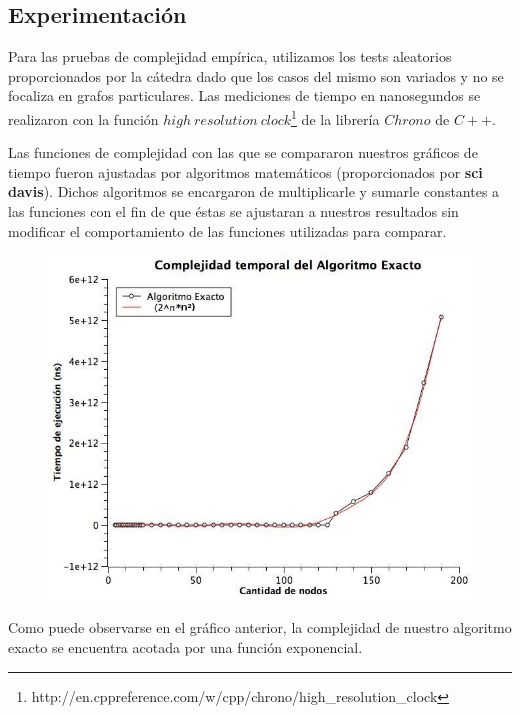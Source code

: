 \subsection{Experimentación}

Para las pruebas de complejidad empírica, utilizamos los tests aleatorios proporcionados por la cátedra dado que los casos del mismo son variados y no se focaliza en grafos particulares. Las mediciones de tiempo en nanosegundos se realizaron con la función $high\ resolution\ clock$\footnote{http://en.cppreference.com/w/cpp/chrono/high\_resolution\_clock} de la librería $Chrono$ de $C++$. 

Las funciones de complejidad con las que se compararon nuestros gráficos de tiempo fueron ajustadas por algoritmos matemáticos (proporcionados por \textbf{sci davis}). Dichos algoritmos se encargaron de multiplicarle y sumarle constantes a las funciones con el fin de que éstas se ajustaran a nuestros resultados sin modificar el comportamiento de las funciones utilizadas para comparar.
	
\begin{figure}[H] %
\begin{center}
\includegraphics[width=350pt]{../imgs/exactoComplejidad.jpg}
\end{center}
\end{figure}

Como puede observarse en el gráfico anterior, la complejidad de nuestro algoritmo exacto se encuentra acotada por una función exponencial.
